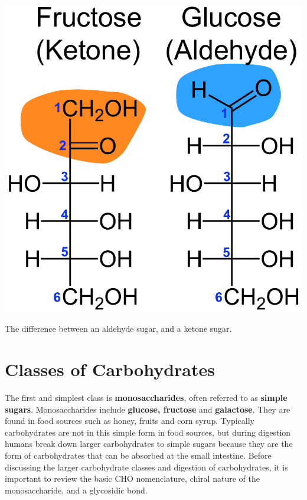 \documentclass{tufte-handout}
\begin{document}
\begin{marginfigure}
\includegraphics{figures/sugar-aldehydes.pdf}
\caption{The difference between an aldehyde sugar, and a ketone sugar.}\label{fig:sugar-aldehydes}
\end{marginfigure}

\section{Classes of Carbohydrates}\label{classes-of-carbohydrates}


 The first and simplest class is \textbf{monosaccharides}, often referred to as \textbf{simple sugars}. Monosaccharides include \textbf{glucose, fructose} and \textbf{galactose}. They are found in food sources such as honey, fruits and corn syrup. Typically carbohydrates are not in this simple form in food sources, but during digestion humans break down larger carbohydrates to simple sugars because they are the form of carbohydrates that can be absorbed at the small intestine. Before discussing the larger carbohydrate classes and digestion of carbohydrates, it is important to review the basic CHO nomenclature, chiral nature of the monosaccharide, and a glycosidic bond.
\end{document}

